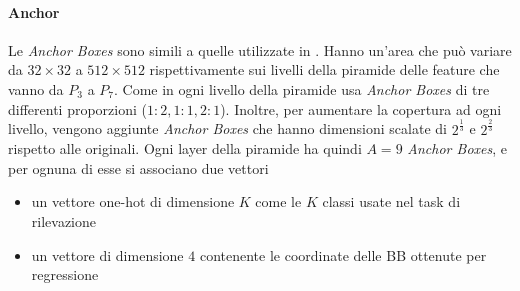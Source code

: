 \paragraph{Anchor}
Le \textit{Anchor Boxes} sono simili a quelle utilizzate in \cite{lin2017feature}. Hanno un'area che può variare da $32 \times 32$ a $512 \times 512$ rispettivamente sui livelli della piramide delle feature che vanno da $P_3$ a $P_7$. Come in \cite{lin2017feature} ogni livello della piramide usa \textit{Anchor Boxes} di tre differenti proporzioni ($1:2, 1:1, 2:1$). Inoltre, per aumentare la copertura ad ogni livello, vengono aggiunte \textit{Anchor Boxes} che hanno dimensioni scalate di $2^\frac{1}{3}$ e $2^\frac{2}{3}$ rispetto alle originali. Ogni layer della piramide ha quindi $A=9$ \textit{Anchor Boxes}, e per ognuna di esse si associano due vettori 
\begin{itemize}
    \item un vettore one-hot di dimensione $K$ come le $K$ classi usate nel task di rilevazione
    \item un vettore di dimensione $4$ contenente le coordinate delle \ac{BB} ottenute per regressione
\end{itemize}

